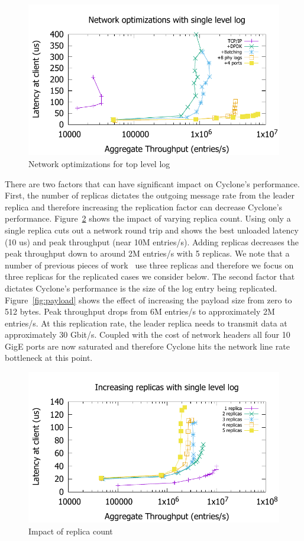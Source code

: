\documentclass[pageno]{jpaper}
\begin{document}
\begin{figure}
\includegraphics[scale=0.6]{results2/network_opts.pdf}
\caption{Network optimizations for top level log}
\label{fig:network_opts}
\end{figure}

There are two factors that can have significant impact on Cyclone's
performance. First, the number of replicas dictates the outgoing message rate
from the leader replica and therefore increasing the replication factor can
decrease Cyclone's performance. Figure~\ref{fig:replicas} shows the impact of
varying replica count. Using only a single replica cuts out a network round trip
and shows the best unloaded latency (10 us) and peak throughput (near 10M
entries/s). Adding replicas decreases the peak throughput down to around 2M
entries/s with 5 replicas. We note that a number of previous pieces of
work~\cite{faast, farm} use three replicas and therefore we focus on three
replicas for the replicated cases we consider below. The second factor that
dictates Cyclone's performance is the size of the log entry being
replicated. Figure~\ref{fig:payload} shows the effect of increasing the payload
size from zero to 512 bytes. Peak throughput drops from 6M entries/s to
approximately 2M entries/s. At this replication rate, the leader replica needs
to transmit data at approximately 30 Gbit/s. Coupled with the cost of network
headers all four 10 GigE ports are now saturated and therefore Cyclone hits the
network line rate bottleneck at this point.

\begin{figure}
\includegraphics[scale=0.6]{results2/replicas.pdf}
\caption{Impact of replica count}
\label{fig:replicas}
\end{figure}
\end{document}
